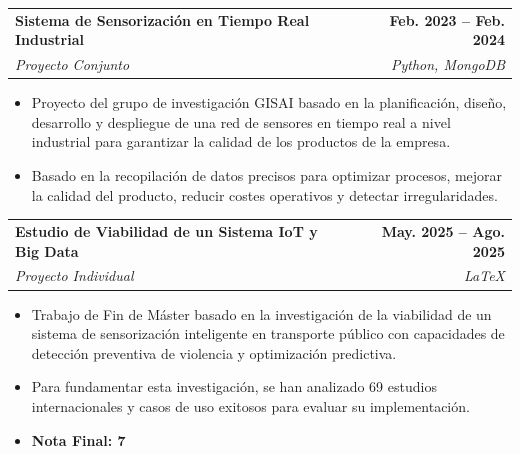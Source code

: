\documentclass[a4paper,10pt]{article}
\makeatletter
\newcommand{\smallblacksquare}{\raisebox{0.4ex}{\rule{0.6ex}{0.6ex}}}
\newenvironment{projectlong}[4]
{
	\begin{tabularx}{\linewidth}{@{}l X r@{}}
		\textbf{#1} & \hfill & \textbf{#2} \\
		\small\textit{#3} & \hfill & \small\textit{#4} \\[3.75pt]
	\end{tabularx}
	\begin{minipage}[t]{\linewidth}
		\begin{itemize}[nosep,after=\strut, leftmargin=1em, itemsep=3pt,label=\smallblacksquare]
		}
		{
		\end{itemize}
	\end{minipage}    
}
\newenvironment{publicationlong}[4]
{
	\begin{tabularx}{\linewidth}{@{}l X r@{}}
		\textbf{#1} & \hfill & \textbf{#2} \\
		\small\textit{#3} & \hfill & \small\textit{#4} \\[3.75pt]
	\end{tabularx}
	\begin{minipage}[t]{\linewidth}
		\begin{itemize}[nosep,after=\strut, leftmargin=1em, itemsep=3pt,label=\smallblacksquare]
		}
		{
		\end{itemize}
	\end{minipage}    
}
\makeatother
\begin{document}
	\begin{projectlong}{Sistema de Sensorización en Tiempo Real Industrial}{Feb. 2023 – Feb. 2024}{Proyecto Conjunto}{Python, MongoDB}
		\item Proyecto del grupo de investigación GISAI basado en la planificación, diseño, desarrollo y despliegue de una red de sensores en tiempo real a nivel industrial para garantizar la calidad de los productos de la empresa.
		\item Basado en la recopilación de datos precisos para optimizar procesos, mejorar la calidad del producto, reducir costes operativos y detectar irregularidades.
	\end{projectlong}
	
	\begin{projectlong}{Estudio de Viabilidad de un Sistema IoT y Big Data}{May. 2025 – Ago. 2025}{Proyecto Individual}{LaTeX}
		\item Trabajo de Fin de Máster basado en la investigación de la viabilidad de un sistema de sensorización inteligente en transporte público con capacidades de detección preventiva de violencia y optimización predictiva.
		\item Para fundamentar esta investigación, se han analizado 69 estudios internacionales y casos de uso exitosos para evaluar su implementación.
		\item \textbf{Nota Final: 7}
	\end{projectlong}
	
	
\end{document}
